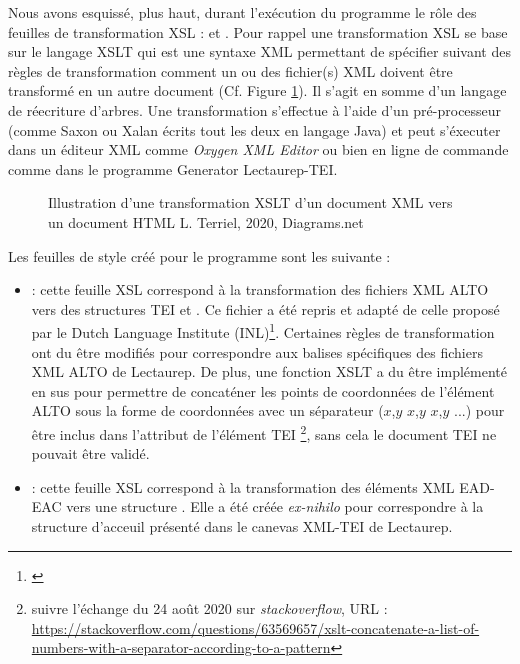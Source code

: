 Nous avons esquissé, plus haut, durant l'exécution du programme le rôle des feuilles de transformation XSL :  et . Pour rappel une transformation XSL se base sur le langage XSLT qui est une syntaxe XML permettant de spécifier suivant des règles de transformation comment un ou des fichier(s) XML doivent être transformé en un autre document (Cf. Figure \ref{fig:example_XSLT}). Il s'agit en somme d'un langage de réecriture d'arbres. Une transformation s'effectue à l'aide d'un pré-processeur (comme Saxon ou Xalan écrits tout les deux en langage Java) et peut s'éxecuter dans un éditeur XML comme \textit{Oxygen XML Editor} ou bien en ligne de commande comme dans le programme Generator Lectaurep-TEI.\\

\begin{figure}[h]
    \centering
    \centerline{}
    \caption{Illustration d'une transformation XSLT d'un document XML vers un document HTML  \textcopyright L. Terriel, 2020, Diagrams.net}
    \label{fig:example_XSLT}
\end{figure}
\newpage
Les feuilles de style créé pour le programme sont les suivante : 
\begin{itemize}
    \item {} : cette feuille XSL correspond à la transformation des fichiers XML ALTO vers des structures TEI  et . Ce fichier a été repris et adapté de celle proposé par le Dutch Language Institute (INL)\footnote{\cite{dutch_language_institute_alto2tei_nodate}}. Certaines règles de transformation ont du être modifiés pour correspondre aux balises spécifiques des fichiers XML ALTO de Lectaurep. De plus, une fonction XSLT a du être implémenté en sus pour permettre de concaténer les points de coordonnées de l'élément ALTO  sous la forme de coordonnées avec un séparateur ($x$,$y$ $x$,$y$ $x$,$y$ ...)  pour 
    être inclus dans l'attribut  de l'élément TEI \footnote{suivre l'échange du 24 août 2020 sur \textit{stackoverflow}, URL : \url{https://stackoverflow.com/questions/63569657/xslt-concatenate-a-list-of-numbers-with-a-separator-according-to-a-pattern}}, sans cela le document TEI ne pouvait être validé.  
    \item {} : cette feuille XSL correspond à la transformation des éléments XML EAD-EAC vers une structure . Elle a été créée \textit{ex-nihilo} pour correspondre à la structure d'acceuil présenté dans le canevas XML-TEI de Lectaurep.  
\end{itemize}

